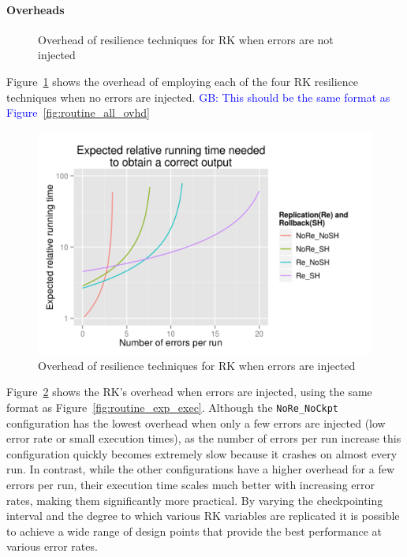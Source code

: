 \documentclass{sig-alternate}
\newcommand{\greg}[1]{%
  \textcolor{blue}{GB: #1}
}
\begin{document}
\paragraph{Overheads}

\begin{figure}[ht!]
\centering
\caption{Overhead of resilience techniques for RK when errors are not injected}
\label{fig:rk_routine_detect_ovhd}
\end{figure}

Figure~\ref{fig:rk_routine_detect_ovhd} shows the overhead of employing each of the four RK resilience techniques when no errors are injected. \greg{This should be the same format as Figure~\ref{fig:routine_all_ovhd}}

\begin{figure}[ht!]
\centering
\includegraphics[width=1.00\columnwidth]{figs/4_1_2_Exp2_Expected_Running_Time_Needed.png}
\caption{Overhead of resilience techniques for RK when errors are injected}
\label{fig:rk_routine_exp_exec}
\end{figure}

Figure~\ref{fig:rk_routine_exp_exec} shows the RK's overhead when errors are injected, using the same format as Figure~\ref{fig:routine_exp_exec}.
Although the \texttt{NoRe\_NoCkpt} configuration has the lowest overhead when only a few errors are injected (low error rate or small execution times), as the number of errors per run increase this configuration quickly becomes extremely slow because it crashes on almost every run.
In contrast, while the other configurations have a higher overhead for a few errors per run, their execution time scales much better with increasing error rates, making them significantly more practical.
By varying the checkpointing interval and the degree to which various RK variables are replicated it is possible to achieve a wide range of design points that provide the best performance at various error rates.
\end{document}
